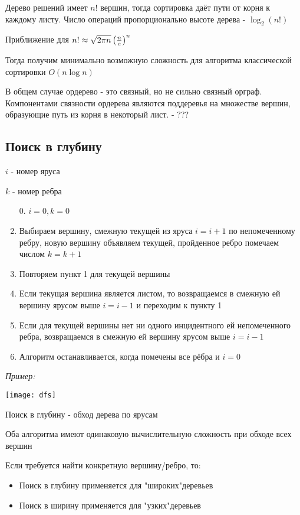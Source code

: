 \documentclass[10pt]{article}
\begin{document}
\par Дерево решений имеет $n!$ вершин, тогда сортировка даёт пути от корня к каждому листу. Число операций пропорционально высоте дерева - $\log_{2}(n!)$
\par Приближение для $n! \approx \sqrt{ 2\pi n } \large\left( \frac{n}{e} \right)^n$
\par Тогда получим минимально возможную сложность для алгоритма классической сортировки $O(n \log n)$

\par В общем случае ордерево - это связный, но не сильно связный орграф. Компонентами связности ордерева являются поддеревья на множестве вершин, образующие путь из корня в некоторый лист. - ???
\subsection*{Поиск в глубину}
\par $i$ - номер яруса
\par $k$ - номер ребра
\begin{enumerate}
    \item[0.] $i = 0, k = 0$
    \item Выбираем вершину, смежную текущей из яруса $i = i + 1$ по непомеченному ребру, новую вершину объявляем текущей, пройденное ребро помечаем числом $k = k + 1$
    \item Повторяем пункт 1 для текущей вершины
    \item Если текущая вершина является листом, то возвращаемся в смежную ей вершину ярусом выше $i = i - 1$ и переходим к пункту 1
    \item Если для текущей вершины нет ни одного инцидентного ей непомеченного ребра, возвращаемся в смежную ей вершину ярусом выше $i = i - 1$
    \item Алгоритм останавливается, когда помечены все рёбра и $i = 0$
\end{enumerate}

\break
\par\textit{Пример:}
\begin{center}
    \texttt{[image: dfs]}
\end{center}
\par Поиск в глубину - обход дерева по ярусам
\par Оба алгоритма имеют одинаковую вычислительную сложность при обходе всех вершин
\par Если требуется найти конкретную вершину/ребро, то:
\begin{itemize}
    \item Поиск в глубину применяется для "широких"\:деревьев
	\item Поиск в ширину применяется для "узких"\:деревьев
\end{itemize}
\end{document}
